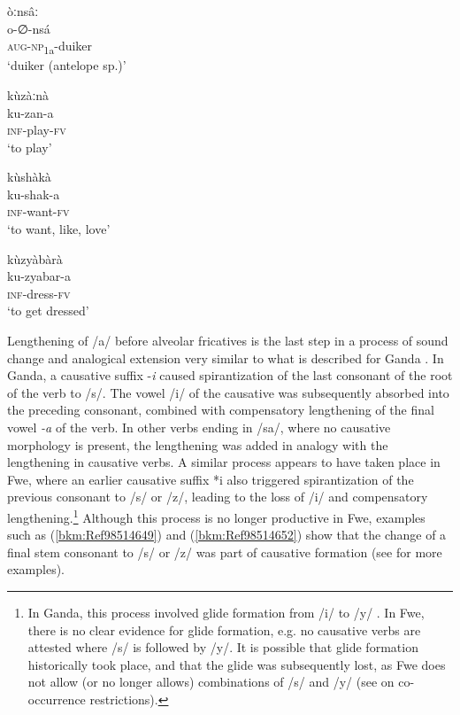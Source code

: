 \ea
\glll òːnsâː\\
o-∅-nsá\\
\textsc{aug}-\textsc{np}\textsubscript{1a}-duiker\\
\glt ‘duiker (antelope sp.)’
\z

\ea
\label{bkm:Ref459627038}
\glll kùzàːnà\\
ku-zan-a\\
\textsc{inf}-play-\textsc{fv}\\
\glt ‘to play’
\z

\ea
\label{bkm:Ref486271209}
\glll kùshàkà\\
ku-shak-a\\
\textsc{inf}-want-\textsc{fv}\\
\glt ‘to want, like, love’
\z

\ea
\label{bkm:Ref486271211}
\glll kùzyàbàrà\\
ku-zyabar-a\\
\textsc{inf}-dress-\textsc{fv}\\
\glt ‘to get dressed’
\z

Lengthening of /a/ before alveolar fricatives is the last step in a process of sound change and ana\-logical extension very similar to what is described for Ganda \citep{Hyman2003a}. In Ganda, a causa\-tive suffix -\textit{i} caused spirantization of the last consonant of the root of the verb to /s/. The vowel /i/ of the causative was subsequently absorbed into the preceding consonant, combined with compensatory lengthening of the final vowel \textit{-a} of the verb. In other verbs ending in /sa/, where no causative morphology is present, the lengthening was added in analogy with the lengthen\-ing in causative verbs. A similar process appears to have taken place in Fwe, where an earlier causa\-tive suffix *i also triggered spirantization of the previous consonant to /s/ or /z/, leading to the loss of /i/ and compensatory lengthening.\footnote{In Ganda, this process involved glide formation from /i/ to /y/ \citep{Hyman2003a}. In Fwe, there is no clear evidence for glide formation, e.g. no causative verbs are attested where /s/ is followed by /y/. It is possible that glide formation historically took place, and that the glide was subsequently lost, as Fwe does not allow (or no longer allows) combinations of /s/ and /y/ (see  on co-occurrence restrictions).} Although this process is no longer productive in Fwe, examples such as (\ref{bkm:Ref98514649}) and (\ref{bkm:Ref98514652}) show that the change of a final stem consonant to /s/ or /z/ was part of causative formation (see  for more examples).

